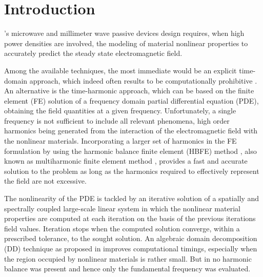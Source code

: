 \documentclass[journal]{IEEEtran}
\begin{document}
%
\IEEEpeerreviewmaketitle



\section{Introduction}


's microwave and millimeter wave passive devices design
requires, when high power densities are involved, the modeling of material
nonlinear properties to accurately predict the steady state electromagnetic field.

Among the available techniques, the most immediate would be an explicit
time-domain approach, which indeed often results to be computationally
prohibitive \cite{deGersem2001}. An alternative is the time-harmonic approach,
which can be based on the finite element (FE) solution of a frequency domain
partial differential equation (PDE), obtaining the field quantities at a given
frequency. Unfortunately, a single frequency is not sufficient to include all
relevant phenomena, high order harmonics being generated from the interaction
of the electromagnetic field with the nonlinear materials. Incorporating a
larger set of harmonics in the FE formulation by using the harmonic balance
finite element (HBFE) method \cite{Yamada1988,Yamada1989}, also known as 
multiharmonic finite element method \cite{Copeland2010, Bachinger2005, Kolmbauer2009}, 
provides a fast and accurate solution to the problem as long as the harmonics 
required to effectively represent the field are not excessive. 

The nonlinearity of the PDE is tackled by an iterative solution of a spatially
and spectrally coupled large-scale linear system in which the nonlinear material
properties are computed at each iteration on the basis of the previous
iterations field values. Iteration stops when the computed solution converge,
within a prescribed tolerance, to the sought solution.
An algebraic domain decomposition (DD) technique as proposed in \cite{Guarnieri2010}
improves computational timings, especially when the region occupied by
nonlinear materials is rather small. But in \cite{Guarnieri2010} no harmonic
balance was present and hence only the fundamental frequency was evaluated.
\end{document}
